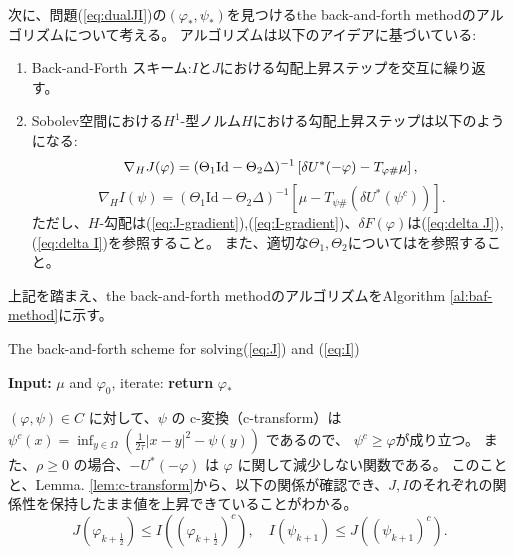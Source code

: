 次に、問題(\ref{eq:dualJI})の$(\varphi_*, \psi_*)$を見つけるthe back-and-forth methodのアルゴリズムについて考える。
アルゴリズムは以下のアイデアに基づいている$:$
\begin{enumerate}
    \item Back-and-Forth スキーム:$I$と$J$における勾配上昇ステップを交互に繰り返す。
    \item Sobolev空間における$H^1$-型ノルム$H$における勾配上昇ステップは以下のようになる:
        \begin{equation*}
            \nabla_H J(\varphi) = (\Theta_1 \text{Id} - \Theta_2 \Delta)^{-1} \left[\delta U^*(- \varphi)-  T_{\varphi \#} \mu \right], \\
        \end{equation*}
        \begin{equation*}
            \nabla_H I(\psi) = (\Theta_1 \text{Id} - \Theta_2 \Delta)^{-1} \left[\mu - T_{\psi \#} (\delta U^*(\psi^c))\right].
        \end{equation*}
    ただし、$H$-勾配は(\ref{eq:J-gradient}),(\ref{eq:I-gradient})、$\delta F(\varphi)$は(\ref{eq:delta J}),(\ref{eq:delta I})を参照すること。
    また、適切な$\Theta_1, \Theta_2$については\cite{MR4238775}を参照すること。
\end{enumerate}

上記を踏まえ、the back-and-forth methodのアルゴリズムをAlgorithm \ref{al:baf-method}に示す。

\begin{algorithm}[tb]
    \caption{The back-and-forth scheme for solving(\ref{eq:J}) and (\ref{eq:I})}
    \label{al:baf-method}
    \begin{algorithmic}
    \State \textbf{Input:} $\mu$ and $\varphi_0$, iterate:
    \State \textbf{return} $\varphi_*$
    \end{algorithmic}
\end{algorithm}

\((\varphi, \psi) \in C\) に対して、\(\psi\) の c-変換（c-transform）は
$
    \psi^c(x) = \inf_{y \in \Omega} \left( \frac{1}{2\tau}|x-y|^2 - \psi(y)\right)
$
であるので、
\(\psi^c \geq \varphi\)が成り立つ。
また、\(\rho \geq 0\) の場合、\(- U^*(-\varphi)\) は \(\varphi\) に関して減少しない関数である。
このことと、Lemma. \ref{lem:c-transform}から、以下の関係が確認でき、$J, I$のそれぞれの関係性を保持したまま値を上昇できていることがわかる。
\[
    J(\varphi_{k + \frac{1}{2}}) \leq I((\varphi_{k + \frac{1}{2}})^c), \quad I(\psi_{k+1}) \leq J((\psi_{k+1})^c). 
\]


